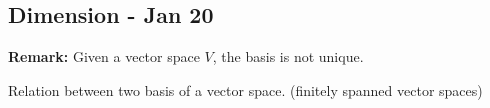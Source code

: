 \documentclass[12pt]{article}
\theoremstyle{plain}
\newtheorem{theorem}{Theorem}[subsection]
\begin{document}




	\newpage

	\subsection{Dimension - Jan 20}
	
	\textbf{Remark:} Given a vector space $V$, the basis is not unique. 

	Relation between two basis of a vector space. (finitely spanned vector 
	spaces)\\
\end{document}
